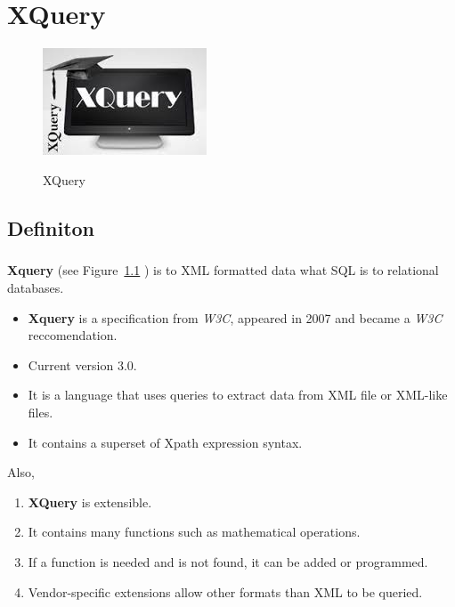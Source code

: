 \documentclass[a4paper,11pt]{report}
\begin{document}
\chapter{XQuery}

\begin{figure}[h]
	\centering
		\includegraphics{images/xquery_image.jpeg}~\\[1cm]
		\caption {XQuery}
		\label{fig:xquery}
\end{figure}

\section{Definiton}


\paragraph{}
\textbf{Xquery} (see Figure~\ref{fig:xquery} ) is to XML formatted data what SQL is to relational databases. \cite{wikixquery}

\begin{itemize}
  \item \textbf{Xquery} is a specification from \textit{W3C}, appeared in 2007 and became a \textit{W3C} reccomendation. \cite{w3xquery}
  \item Current version 3.0.
  \item It is a language that uses queries to extract data from XML file or XML-like files.
  \item It contains a superset of Xpath expression syntax. \cite{xpath}
\end{itemize}
 
 Also, \\
 
 \begin{enumerate}
  \item \textbf{XQuery} is extensible.
  \item It contains many functions such as mathematical operations.
  \item If a function is needed and is not found, it can be added or programmed.
  \item Vendor-specific extensions allow other formats than XML to be queried.
\end{enumerate}
\end{document}
